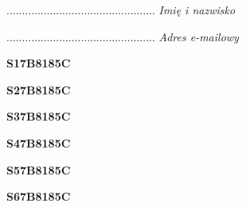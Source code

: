 \begin{turn}{90}\begin{minipage}{\linewidth} \vspace{20mm} ................................................  \textit{Imię i nazwisko}\end{minipage}\end{turn}

\begin{turn}{90}\begin{minipage}{\linewidth} \vspace{20mm} ................................................  \textit{Adres e-mailowy}\end{minipage}\end{turn}

\begin{turn}{90}\huge \begin{minipage}{\linewidth} \vspace{10mm}\textbf{S17B8185C}\end{minipage}\end{turn}

\begin{turn}{90}\huge \begin{minipage}{\linewidth} \vspace{10mm}\textbf{S27B8185C}\end{minipage}\end{turn}

\begin{turn}{90}\huge \begin{minipage}{\linewidth} \vspace{10mm}\textbf{S37B8185C}\end{minipage}\end{turn}

\begin{turn}{90}\huge \begin{minipage}{\linewidth} \vspace{10mm}\textbf{S47B8185C}\end{minipage}\end{turn}

\begin{turn}{90}\huge \begin{minipage}{\linewidth} \vspace{10mm}\textbf{S57B8185C}\end{minipage}\end{turn}

\begin{turn}{90}\huge \begin{minipage}{\linewidth} \vspace{10mm}\textbf{S67B8185C}\end{minipage}\end{turn}

